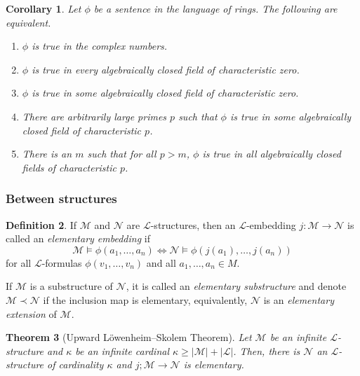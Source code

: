 \documentclass{amsart}
\newtheorem{theorem}{Theorem}[subsection]
\newtheorem{corollary}[theorem]{Corollary}
\theoremstyle{definition}
\newtheorem{definition}[theorem]{Definition}
\numberwithin{equation}{section}
\begin{document}
\begin{corollary}
    Let $\phi$ be a sentence in the language of rings.
    The following are equivalent.
    \begin{enumerate}[label = {\roman*)}]
        \item $\phi$ is true in the complex numbers.
        \item $\phi$ is true in every algebraically closed field of characteristic zero.
        \item $\phi$ is true in some algebraically closed field of characteristic zero.
        \item There are arbitrarily large primes $p$ such that $\phi$ is true in some algebraically closed field of characteristic $p$.
        \item There is an $m$ such that for all $p > m$, $\phi$ is true in all algebraically closed fields of characteristic $p$.
    \end{enumerate}
\end{corollary}

\subsubsection{Between structures}
\begin{definition}
    If $\mathcal{M}$ and $\mathcal{N}$ are $\mathcal{L}$-structures,
    then an $\mathcal{L}$-embedding $j: \mathcal{M} \to \mathcal{N}$ is called an \emph{elementary embedding} if 
    \[
    \mathcal{M} \models \phi(a_1,\dots,a_n) \iff \mathcal{N} \models \phi(j(a_1),\dots,j(a_n))
    \] 
    for all $\mathcal{L}$-formulas $\phi(v_1,\dots,v_n)$ and all $a_1,\dots,a_n \in M$.

    If $\mathcal{M}$ is a substructure of $\mathcal{N}$, 
    it is called an \emph{elementary substructure} and 
    denote $\mathcal{M} \prec \mathcal{N}$ if the inclusion map is elementary,
    equivalently, $\mathcal{N}$ is an \emph{elementary extension} of $\mathcal{M}$.
\end{definition}

\begin{theorem}[Upward L\"owenheim--Skolem Theorem]
    Let $\mathcal{M}$ be an infinite $\mathcal{L}$-structure and 
    $\kappa$ be an infinite cardinal $\kappa \ge |\mathcal{M}| + |\mathcal{L}|$.
    Then, there is $\mathcal{N}$ an $\mathcal{L}$-structure of cardinality $\kappa$ and $j; \mathcal{M} \to \mathcal{N}$ is elementary.
\end{theorem}
\end{document}

